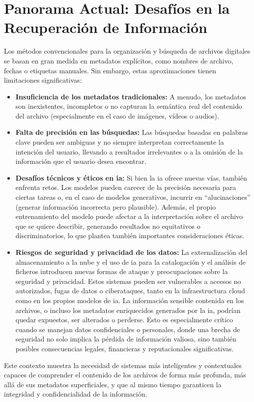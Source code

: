 \section{Panorama Actual: Desafíos en la Recuperación de Información}
Los métodos convencionales para la organización y búsqueda de archivos digitales se basan en gran medida en metadatos explícitos, como nombres de archivo, fechas o etiquetas manuales. Sin embargo, estas aproximaciones tienen limitaciones significativas:
\begin{itemize}
\item  \textbf{Insuficiencia de los metadatos tradicionales:} A menudo, los metadatos son inexistentes, incompletos o no capturan la semántica real del contenido del archivo (especialmente en el caso de imágenes, vídeos o audios).
\item  \textbf{Falta de precisión en las búsquedas:} Las búsquedas basadas en palabras clave pueden ser ambiguas y no siempre interpretan correctamente la intención del usuario, llevando a resultados irrelevantes o a la omisión de la información que el usuario desea encontrar.
\item  \textbf{Desafíos técnicos y éticos en \gls{ia}:} Si bien la \gls{ia} ofrece nuevas vías, también enfrenta retos. Los modelos pueden carecer de la precisión necesaria para ciertas tareas o, en el caso de modelos generativos, incurrir en ``alucinaciones'' (generar información incorrecta pero plausible). Además, el propio entrenamiento del modelo puede afectar a la interpretación sobre el archivo que se quiere describir, generando resultados no equitativos o discriminatorios, lo que plantea también importantes consideraciones éticas.
\item \textbf{Riesgos de seguridad y privacidad de los datos:} La externalización del almacenamiento a la nube y el uso de \gls{ia} para la catalogación y el análisis de ficheros introducen nuevas formas de ataque y preocupaciones sobre la seguridad y privacidad. Estos sistemas pueden ser vulnerables a accesos no autorizados, fugas de datos o ciberataques, tanto en la infraestructura cloud como en los propios modelos de \gls{ia}. La información sensible contenida en los archivos, o incluso los metadatos enriquecidos generados por la \gls{ia}, podrían quedar expuestos, ser alterados o perderse. Esto es especialmente crítico cuando se manejan datos confidenciales o personales, donde una brecha de seguridad no solo implica la pérdida de información valiosa, sino también posibles consecuencias legales, financieras y reputacionales significativas.
\end{itemize}
Este contexto muestra la necesidad de sistemas más inteligentes y contextuales capaces de comprender el contenido de los archivos de forma más profunda, más allá de sus metadatos superficiales, y que al mismo tiempo garanticen la integridad y confidencialidad de la información.

